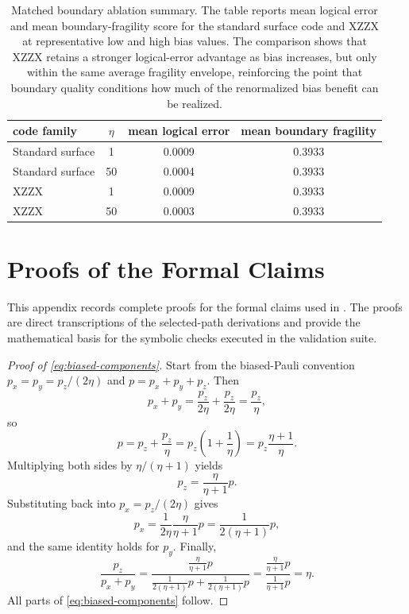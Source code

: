 \documentclass{article} %
\begin{document}
\begin{table}[t]
\caption{Matched boundary ablation summary. The table reports mean logical error and mean boundary-fragility score for the standard surface code and XZZX at representative low and high bias values. The comparison shows that XZZX retains a stronger logical-error advantage as bias increases, but only within the same average fragility envelope, reinforcing the point that boundary quality conditions how much of the renormalized bias benefit can be realized.}
\label{tab:boundary-summary}
\begin{center}
\small
\renewcommand{\arraystretch}{1.1}
\setlength{\tabcolsep}{4pt}
\begin{tabular}{lccc}
\hline
code family & $\eta$ & mean logical error & mean boundary fragility \\
\hline
Standard surface & 1 & 0.0009 & 0.3933 \\
Standard surface & 50 & 0.0004 & 0.3933 \\
XZZX & 1 & 0.0009 & 0.3933 \\
XZZX & 50 & 0.0003 & 0.3933 \\
\hline
\end{tabular}
\end{center}
\end{table}

\section{Proofs of the Formal Claims}
\label{app:proofs}

This appendix records complete proofs for the formal claims used in . The proofs are direct transcriptions of the selected-path derivations and provide the mathematical basis for the symbolic checks executed in the validation suite.

\begin{proof}[Proof of \eqref{eq:biased-components}]
Start from the biased-Pauli convention $p_x = p_y = p_z/(2\eta)$ and $p = p_x + p_y + p_z$. Then
\[
p_x + p_y = \frac{p_z}{2\eta} + \frac{p_z}{2\eta} = \frac{p_z}{\eta},
\]
so
\[
p = p_z + \frac{p_z}{\eta} = p_z\!\left(1+\frac{1}{\eta}\right) = p_z\frac{\eta+1}{\eta}.
\]
Multiplying both sides by $\eta/(\eta+1)$ yields
\[
p_z = \frac{\eta}{\eta+1}p.
\]
Substituting back into $p_x = p_z/(2\eta)$ gives
\[
p_x = \frac{1}{2\eta}\frac{\eta}{\eta+1}p = \frac{1}{2(\eta+1)}p,
\]
and the same identity holds for $p_y$. Finally,
\[
\frac{p_z}{p_x+p_y}
=
\frac{\frac{\eta}{\eta+1}p}{\frac{1}{2(\eta+1)}p + \frac{1}{2(\eta+1)}p}
=
\frac{\frac{\eta}{\eta+1}p}{\frac{1}{\eta+1}p}
= \eta.
\]
All parts of \eqref{eq:biased-components} follow. \qedhere
\end{proof}
\end{document}
